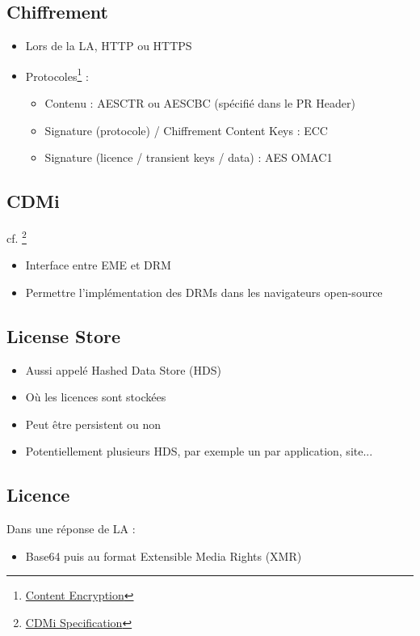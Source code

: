 \documentclass[french]{article}
\begin{document}
\subsection{Chiffrement}

\begin{itemize}
	\item Lors de la LA, HTTP ou HTTPS
	\item Protocoles\footnote{\href{https://learn.microsoft.com/en-us/playready/packaging/content-encryption}{Content Encryption}} : 
	\begin{itemize}
		\item Contenu : AESCTR ou AESCBC (spécifié dans le PR Header)
		\item Signature (protocole) / Chiffrement Content Keys : ECC 
		\item Signature (licence / transient keys / data) : AES OMAC1
	\end{itemize}
\end{itemize}


\subsection{CDMi}

cf. \footnote{\href{https://download.microsoft.com/download/E/A/4/EA470677-6C3C-4AFE-8A86-A196ADFD0F78/Content Decryption Module Interface Specification.pdf}{CDMi Specification}}

\begin{itemize}
	\item Interface entre EME et DRM
	\item Permettre l'implémentation des DRMs dans les navigateurs open-source
\end{itemize}


\subsection{License Store}
\begin{itemize}
	\item Aussi appelé Hashed Data Store (HDS)
	\item Où les licences sont stockées
	\item Peut être persistent ou non
	\item Potentiellement plusieurs HDS, par exemple un par application, site...
\end{itemize}

\subsection{Licence}
Dans une réponse de LA : 
\begin{itemize}
	\item Base64 puis au format Extensible Media Rights (XMR)
	
\end{itemize}
\end{document}
